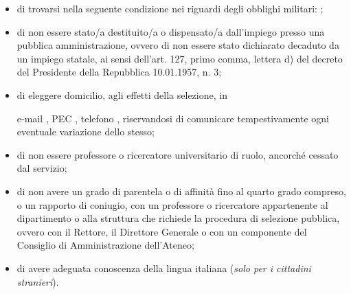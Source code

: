 \documentclass[a4paper,10pt]{article}
\begin{document}
\begin{Form}
\begin{itemize}
\myTextField[.9\textwidth]{}
\item di trovarsi nella seguente condizione nei riguardi degli obblighi militari: 
\myTextField{};
\item di non essere stato/a destituito/a o dispensato/a dall'impiego presso una 
pubblica amministrazione, ovvero di non essere stato dichiarato decaduto da un 
impiego statale, ai sensi dell'art. 127, primo comma, lettera d) del decreto 
del Presidente della Repubblica 10.01.1957, n. 3;
\item di eleggere domicilio, agli effetti della selezione, in 
\begin{center}
 \titleTextField[6cm]{}%
\end{center} 
e-mail \myTextField[4cm]{}, PEC \myTextField[4cm]{}, telefono \myTextField{}, 
riservandosi di comunicare tempestivamente ogni eventuale variazione dello stesso;
\item di non essere professore o ricercatore universitario di ruolo, ancorché 
cessato dal servizio;
\item di non avere un grado di parentela o di affinità fino al quarto grado 
compreso, o un rapporto di coniugio, con un professore o ricercatore appartenente 
al dipartimento o alla struttura che richiede la procedura di selezione pubblica, 
ovvero con il Rettore, il Direttore Generale o con un componente del Consiglio 
di Amministrazione dell’Ateneo;
\item di avere adeguata conoscenza della lingua italiana (\emph{solo per i 
cittadini stranieri}).
\end{itemize}

\vspace{\fill}
\end{Form}
\end{document}
